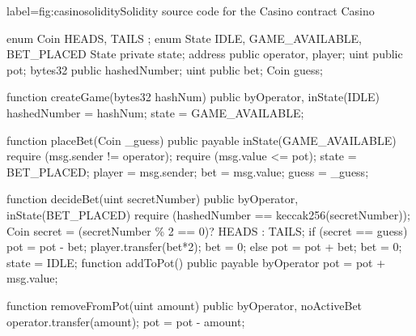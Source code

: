 \documentclass[a4paper,UKenglish,cleveref, autoref, thm-restate]{oasics-v2021}
\begin{document}
\begin{code}{label={fig:casino}}{solidity}{Solidity source code for the Casino}
	contract Casino {
		enum Coin { HEADS, TAILS } ;
		enum State { IDLE, GAME_AVAILABLE,  BET_PLACED }
		State private state; 
		address public operator, player;
		uint public pot;
		bytes32 public hashedNumber;
		uint public bet;
		Coin guess;

		function createGame(bytes32 hashNum) 
			public byOperator, inState(IDLE) { 
			hashedNumber = hashNum; 
			state = GAME_AVAILABLE;
		}

		function placeBet(Coin _guess) public payable inState(GAME_AVAILABLE) {
			require (msg.sender != operator);
			require (msg.value <= pot);
			state = BET_PLACED; 
			player = msg.sender; 
			bet = msg.value; 
			guess = _guess; 
		}

 		function decideBet(uint secretNumber) 
		public byOperator, inState(BET_PLACED) { 
			require (hashedNumber == keccak256(secretNumber)); 
			Coin secret = (secretNumber \% 2 == 0)? HEADS : TAILS;
			if (secret == guess) {
				pot = pot - bet;  
				player.transfer(bet*2);  
				bet = 0;} 
			else {
				pot = pot + bet; 
				bet = 0;
				}
			state = IDLE;}
		function addToPot() public payable byOperator { pot = pot + msg.value;}

		function removeFromPot(uint amount) public byOperator, noActiveBet { 
			operator.transfer(amount);  
			pot = pot - amount;}
		}
\end{code}
\end{document}

